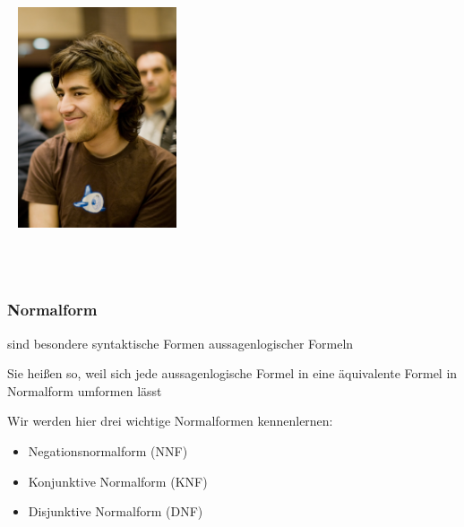 \documentclass[aspectratio=1610,onlymath]{beamer}
\begin{document}
% 
\begin{frame}\frametitle{}

~\hfill
\includegraphics[height=6.5cm]{images/aaron-swartz}~~
\hfill~

\\
\\


\end{frame}


\begin{frame}\frametitle{Normalform}

 sind besondere syntaktische Formen aussagenlogischer Formeln
\bigskip

Sie heißen so, weil sich jede aussagenlogische Formel in eine äquivalente Formel in Normalform umformen lässt
\bigskip

Wir werden hier drei wichtige Normalformen kennenlernen:
\begin{itemize}
\item \alert{Negationsnormalform} (NNF)
\item \alert{Konjunktive Normalform} (KNF)
\item \alert{Disjunktive Normalform} (DNF)
\end{itemize}

\end{frame}
\end{document}
